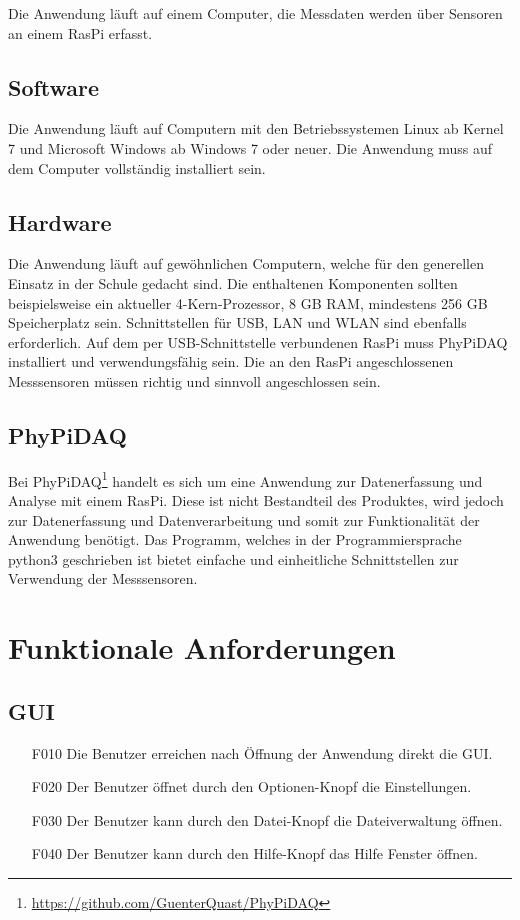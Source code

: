 \documentclass[parskip=full]{scrartcl}
\begin{document}
Die Anwendung läuft auf einem Computer, die Messdaten werden über Sensoren an einem \gls{RasPi} erfasst.

\subsection{Software}

Die Anwendung läuft auf Computern mit den Betriebssystemen Linux ab Kernel 7 und Microsoft Windows ab Windows 7 oder neuer. Die Anwendung muss auf dem Computer vollständig installiert sein. 

\subsection{Hardware}

Die Anwendung läuft auf gewöhnlichen Computern, welche für den generellen Einsatz in der Schule gedacht sind.
Die enthaltenen Komponenten sollten beispielsweise ein aktueller 4-Kern-Prozessor, 8 GB RAM,
mindestens 256 GB Speicherplatz sein. Schnittstellen für USB, LAN und WLAN sind ebenfalls erforderlich. 
Auf dem per USB-Schnittstelle verbundenen \gls{RasPi} muss \gls{PhyPiDAQ} installiert und verwendungsfähig sein.
Die an den \gls{RasPi} angeschlossenen Messsensoren müssen richtig und sinnvoll angeschlossen sein.

\subsection{PhyPiDAQ}

Bei PhyPiDAQ\footnote{\url{https://github.com/GuenterQuast/PhyPiDAQ}} handelt es sich um eine Anwendung zur Datenerfassung und Analyse mit einem \gls{RasPi}. Diese ist nicht Bestandteil des Produktes, wird jedoch zur Datenerfassung und Datenverarbeitung und somit zur Funktionalität der Anwendung  benötigt. Das Programm, welches in der Programmiersprache \gls{python3} geschrieben ist bietet einfache und einheitliche Schnittstellen zur Verwendung der Messsensoren.


\section{Funktionale Anforderungen}\label{funktionale}


\subsection{GUI}

\begin{itemize}
\item[F010] Die Benutzer erreichen nach Öffnung der Anwendung direkt die \gls{GUI}.
\item[F020] Der Benutzer öffnet durch den Optionen-Knopf die Einstellungen.
\item[F030] Der Benutzer kann durch den Datei-Knopf die Dateiverwaltung öffnen.
\item[F040] Der Benutzer kann durch den Hilfe-Knopf das Hilfe Fenster öffnen.
\end{itemize}
\end{document}
